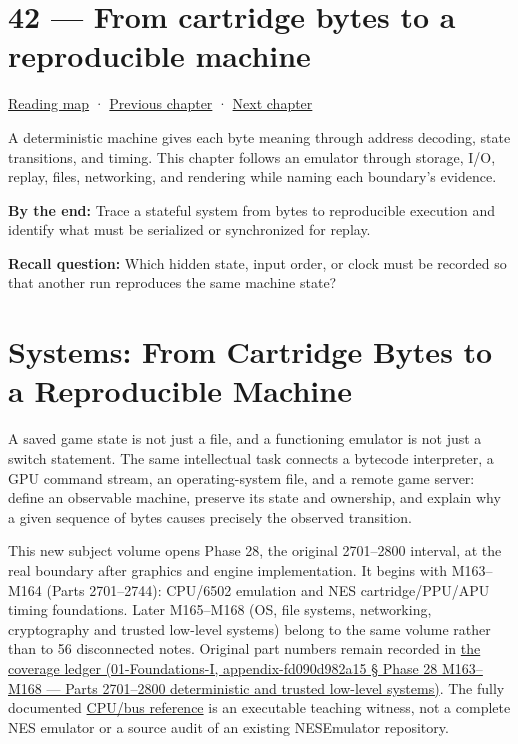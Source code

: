 \hypertarget{06-engine-ii-ch042}{}
\section{42 --- From cartridge bytes to a reproducible machine}\label{from-cartridge-bytes-to-a-reproducible-machine}

\href{Chapter\%20Edition/03\%20-\%20Game\%20Engine/00\%20-\%20Reading\%20Map}{Reading map} · \hyperref[06-engine-ii-ch041]{Previous chapter} · \hyperref[06-engine-ii-ch043]{Next chapter}

A deterministic machine gives each byte meaning through address decoding, state transitions, and timing. This chapter follows an emulator through storage, I/O, replay, files, networking, and rendering while naming each boundary's evidence.

\textbf{By the end:} Trace a stateful system from bytes to reproducible execution and identify what must be serialized or synchronized for replay.

\textbf{Recall question:} Which hidden state, input order, or clock must be recorded so that another run reproduces the same machine state?

\section{Systems: From Cartridge Bytes to a Reproducible Machine}\label{systems-from-cartridge-bytes-to-a-reproducible-machine}

A saved game state is not just a file, and a functioning emulator is not just a switch statement. The same intellectual task connects a bytecode interpreter, a GPU command stream, an operating-system file, and a remote game server: define an observable machine, preserve its state and ownership, and explain why a given sequence of bytes causes precisely the observed transition.

This new subject volume opens Phase 28, the original 2701--2800 interval, at the real boundary after graphics and engine implementation. It begins with M163--M164 (Parts 2701--2744): CPU/6502 emulation and NES cartridge/PPU/APU timing foundations. Later M165--M168 (OS, file systems, networking, cryptography and trusted low-level systems) belong to the same volume rather than to 56 disconnected notes. Original part numbers remain recorded in \href{}{the coverage ledger (01-Foundations-I, appendix-fd090d982a15 § Phase 28 M163--M168 --- Parts 2701--2800 deterministic and trusted low-level systems)}. The fully documented \href{tools/labs/phase28_emulator_core_lab.cpp}{CPU/bus reference} is an executable teaching witness, not a complete NES emulator or a source audit of an existing NESEmulator repository.

